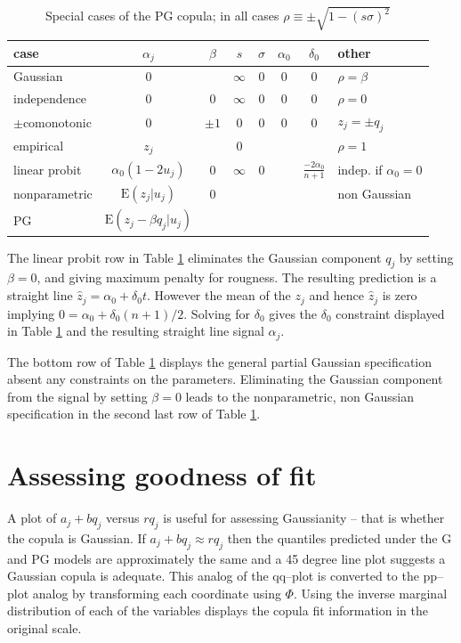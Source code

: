 \documentclass[authoryear]{elsarticle}
\newcommand{\E}{\mathrm{E}}
\newcommand{\tref}[1]{Table \ref{#1}}
\begin{document}
 \begin{table}[htdp]
\caption{Special cases of the PG copula; in all cases $\rho\equiv\pm\sqrt{1-(s\sigma)^2}$}\label{pg}
\begin{center}
\begin{tabular}{l|c|ccccc|l}
\hline
case& $\alpha_j$ & $\beta$ &$s$ & $\sigma$ & $\alpha_0$&$\delta_0$  & other\\
\hline
Gaussian & 0 &  & $\infty$ & $0$&  0&0 &$\rho=\beta$\\
independence &  0 & 0 & $\infty$&0 & 0 &0 &$\rho=0$\\
$\pm$comonotonic  & 0 &$\pm 1$ &0 & 0 &0 & 0 &$z_j=\pm q_j$  \\
empirical  & $z_j$ &  & $0$  &  &   &  &$\rho=1$ \\ 
linear probit &$\alpha_0(1-2u_j)$&  0 &  $\infty$ &0& & $\frac{-2\alpha_0}{n+1}$ &indep. if $\alpha_0=0$\\
nonparametric & $\E(z_j|u_j)$  & 0 & & & &  & non Gaussian \\
PG & $\E(z_j-\beta q_j|u_j)$ & & & & & &  \\
\hline
\end{tabular}
\end{center}
\end{table}%

The linear probit row in \tref{pg}  eliminates the Gaussian component $q_j$ by setting $\beta=0$, and giving maximum penalty for rougness.   The resulting prediction  is a straight line $\hat z_j=\alpha_0+\delta_0 t$.  However the mean of the $z_j$ and hence $\hat z_j$ is zero implying $0=\alpha_0 + \delta_0(n+1)/2$.   Solving for $\delta_0$ gives the $\delta_0$ constraint displayed in \tref{pg} and the resulting straight line signal $\alpha_j$.

The bottom row of \tref{pg} displays the general partial Gaussian specification absent  any constraints on the parameters.  Eliminating the Gaussian component from the signal by setting $\beta=0$ leads to the nonparametric, non Gaussian specification in the second last row of \tref{pg}.

\section{Assessing goodness of fit}

A plot of $a_j+b q_j$ versus $r q_j$ is useful for assessing Gaussianity -- that is whether the copula  is Gaussian.   If $a_j+bq_j\approx rq_j$ then the quantiles predicted under the G and PG models are approximately the same and  a 45 degree line plot suggests a Gaussian copula is adequate.     This analog of the qq--plot is converted to the pp--plot analog  by transforming each coordinate using $\Phi$.   Using the inverse marginal distribution of each of the variables displays the copula fit information in the original scale. 
\end{document}
